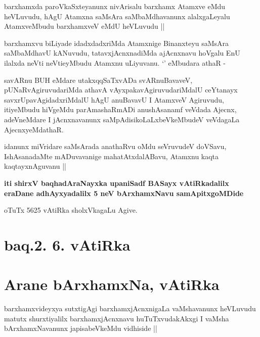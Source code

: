 \begin{artha}
barxhamxda paroVkaSxteyanunx nivArisalu barxhamx Atamxve eMdu
heVLuvudu, hAgU Atamxna saMsAra saMbaMdhavanunx alalxgaLeyalu
AtamxveMbudu barxhamxveV eMdU heVLuvudu ||
\end{artha}


\begin{artha}
barxhamxvu biLiyade idadxdadxriMda Atamxnige Binanxteyu saMsAra
saMbaMdhavU kANuvudu, tatavxjAcnxnadiMda ajAcnxnavu hoVgalu EnU
ilalxda neVti neVtieyMbudu Atamxnu uLiyuvanu. `\stext' eMbudara athaR -
\end{artha}

\begin{artha}
savARnu BUH eMdare utakxqqSaTxvADa svARnuBavaveV, pUNaRvAgiruvudariMda
athavA vAyxpakavAgiruvudariMdalU ceYtanayx savxrUpavAgidadxriMdalU
hAgU anuBavavU I AtamxveV Agiruvudu, itiyeMbudu hiVgeMdu
parAmashaRmADi anushAsanamf veVdada Ajecnx, adeVneMdare I
jAcnxnavanunx saMpAdisikoLaLxbeVkeMbudeV veVdagaLa AjecnxyeMdathaR.
\end{artha}

\begin{artha}
idanunx miVridare saMsArada anathaRvu oMdu seVruvudeV doVSavu,
IshAsanadaMte mADuvavanige mahatAtxdalABavu, Atamxnu kaqta
kaqtayxnAguvanu ||
\end{artha}

\begin{center}
\textbf{iti shirxV baqhadAraNayxka upaniSadf BASayx vAtiRkadalilx eraDane
adhAyxyadalilx 5 neV bArxhamxNavu samApitxgoMDide}

\medskip
oTuTx 5625 vAtiRka sholxVkagaLu Agive.
\end{center}

\section*{baq.2. 6. vAtiRka}

\section*{Arane bArxhamxNa, vAtiRka}

\begin{artha}
barxhamxvideyxya sutxtigAgi barxhamxjAcnxnigaLa vaMshavanunx heVLuvudu
matutx shurxtiyalilx barxhamxjAcnxnavu huTuTxvudakAkxgi I vaMsha
bArxhamxNavanunx japisabeVkeMdu vidhiside ||
\end{artha}

